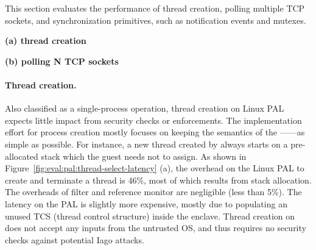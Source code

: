 \label{sec:eval:pal:sched}

This section evaluates the performance of thread creation,
polling multiple TCP sockets,
and synchronization primitives, such as notification events and mutexes. 


\begin{figure*}[t!]
\centering
\footnotesize
{}
\parbox{0.49\textwidth}{\centering\bf (a) thread creation}
\parbox{0.49\textwidth}{\centering\bf (b) polling N TCP sockets}
\caption{(a) Thread creation latency and (b) latency of polling a number of TCP sockets.
Lower is better.
The comparison is between (1)  and  on Linux; (2)  and  on the Linux PAL, with and without a \seccomp{} filter ({\bf +SC}) and reference monitor ({\bf +RM}); (3) the same \hostapis{} on the \sgx{} PAL.}
\label{fig:eval:pal:thread-select-latency}
\end{figure*}


\paragraph{Thread creation.}
Also classified as a single-process operation,
thread creation on Linux PAL
expects little impact from security checks or enforcements.
The implementation effort
for process creation mostly focuses on keeping the semantics of the \hostapi{}------as simple as possible.
For instance, a new thread created by  always starts
on a pre-allocated stack
which the guest needs not to assign.
As shown in
Figure~\ref{fig:eval:pal:thread-select-latency} (a),
the overhead
on the Linux PAL
to create and terminate a thread
is \roughly{}46\%,
most of which results from stack allocation.
The overheads of \seccomp{} filter and reference monitor are negligible (less than 5\%).
The latency on the \sgx{} PAL
is slightly more expensive, mostly due to
populating an unused TCS (thread control structure) inside the enclave.
Thread creation on \sgx{} does not accept any inputs
from the untrusted OS,
and thus requires no security checks
against potential Iago attacks.





